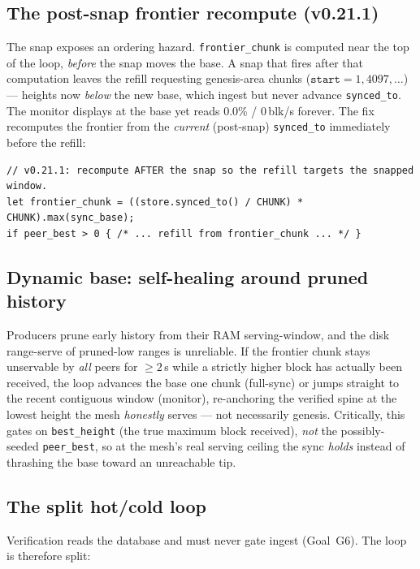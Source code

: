 \documentclass[11pt,a4paper]{article}
\newcommand{\code}[1]{\lstinline[basicstyle=\ttfamily\normalsize\color{codekw}]{#1}}
\begin{document}
\subsection{The post-snap frontier recompute (v0.21.1)}

The snap exposes an ordering hazard. \texttt{frontier\_chunk} is computed near the
top of the loop, \emph{before} the snap moves the base. A snap that fires after
that computation leaves the refill requesting genesis-area chunks
($\texttt{start} = 1, 4097, \dots$) --- heights now \emph{below} the new base, which
ingest but never advance \code{synced_to}. The monitor displays at the base yet
reads 0.0\% / 0\,blk/s forever. The fix recomputes the frontier from the
\emph{current} (post-snap) \code{synced_to} immediately before the refill:

\begin{lstlisting}
// v0.21.1: recompute AFTER the snap so the refill targets the snapped window.
let frontier_chunk = ((store.synced_to() / CHUNK) * CHUNK).max(sync_base);
if peer_best > 0 { /* ... refill from frontier_chunk ... */ }
\end{lstlisting}

\subsection{Dynamic base: self-healing around pruned history}

Producers prune early history from their RAM serving-window, and the disk
range-serve of pruned-low ranges is unreliable. If the frontier chunk stays
unservable by \emph{all} peers for $\ge 2$\,s while a strictly higher block has
actually been received, the loop advances the base one chunk (full-sync) or jumps
straight to the recent contiguous window (monitor), re-anchoring the verified
spine at the lowest height the mesh \emph{honestly} serves --- not necessarily
genesis. Critically, this gates on \code{best_height} (the true maximum block
received), \emph{not} the possibly-seeded \texttt{peer\_best}, so at the mesh's
real serving ceiling the sync \emph{holds} instead of thrashing the base toward an
unreachable tip.

\subsection{The split hot/cold loop}

Verification reads the database and must never gate ingest (Goal~G6). The loop is
therefore split:
\end{document}
